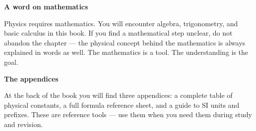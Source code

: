 \vspace{0.5cm}
\textbf{A word on mathematics}
\vspace{0.3cm}

Physics requires mathematics. You will encounter algebra,
trigonometry, and basic calculus in this book. If you find
a mathematical step unclear, do not abandon the chapter ---
the physical concept behind the mathematics is always
explained in words as well. The mathematics is a tool.
The understanding is the goal.

\vspace{0.5cm}
\textbf{The appendices}
\vspace{0.3cm}

At the back of the book you will find three appendices:
a complete table of physical constants, a full formula
reference sheet, and a guide to SI units and prefixes.
These are reference tools --- use them when you need them
during study and revision.
